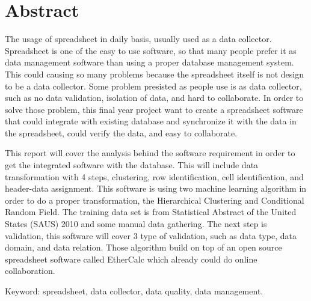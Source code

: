 \clearpage
\chapter*{Abstract}

The usage of spreadsheet in daily basis, usually used as a data collector. Spreadsheet is one of the easy to use software, so that many people prefer it as data management software than using a proper database management system. This could causing so many problems because the spreadsheet itself is not design to be a data collector. Some problem presisted as people use is as data collector, such as no data validation, isolation of data, and hard to collaborate. In order to solve those problem, this final year project want to create a spreadsheet software that could integrate with existing database and synchronize it with the data in the spreadsheet, could verify the data, and easy to collaborate.

This report will cover the analysis behind the software requirement in order to get the integrated software with the database. This will include data transformation with 4 steps, clustering, row identification, cell identification, and header-data assignment. This software is using two machine learning algorithm in order to do a proper transformation, the Hierarchical Clustering and Conditional Random Field. The training data set is from Statistical Abstract of the United States (SAUS) 2010 and some manual data gathering. The next step is validation, this software will cover 3 type of validation, such as data type, data domain, and data relation. Those algorithm build on top of an open source spreadsheet software called EtherCalc which already could do online collaboration.

Keyword: spreadsheet, data collector, data quality, data management.
\clearpage
